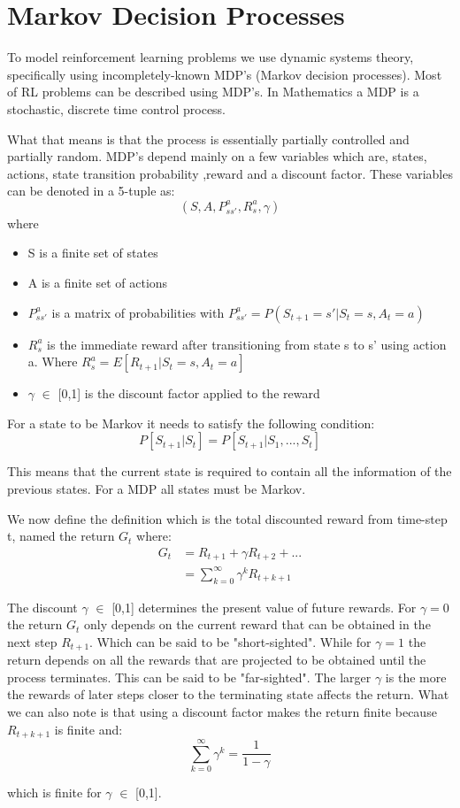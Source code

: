 \graphicspath{{MDP/fig/}}

\chapter{Markov Decision Processes}
\label{chap:MDP}

To model reinforcement learning problems we use dynamic systems theory, specifically using incompletely-known MDP's (Markov decision
processes). Most of RL problems can be described using MDP's. In Mathematics a MDP is a stochastic, discrete time control process.

What that means is that the process is essentially partially controlled and partially random. MDP's depend mainly on a few variables which are, states, actions, state transition probability ,reward and a discount factor\cite{sutton_barto}. These variables can be denoted in a 5-tuple as:
\[(S,A,P^{a}_{ss'},R^{a}_{s},\gamma)\] where
\begin{itemize}
	\item S is a finite set of states
	\item A is a finite set of actions
	\item $P^{a}_{ss'}$ is a matrix of probabilities with $P^{a}_{ss'} = P(S_{t+1} = s' | S_t = s,A_t = a) $
	\item $R^{a}_{s}$ is the immediate reward after transitioning from state s to s' using action a. Where $R^{a}_{s} = E[R_{t+1}|S_t =s, A_t =a]$
	\item $\gamma$ $\in$ [0,1] is the discount factor applied to the reward
\end{itemize}

For a state to be Markov it needs to satisfy the following condition:
\[P[S_{t+1}|S_{t}] = P[S_{t+1}|S_{1},...,S_{t}]\]

This means that the current state is required to contain all the information of the previous states. For a MDP all states must be Markov.

We now define the definition which is the total discounted reward from time-step t, named the return $G_t$ where:
\begin{align}
	G_t &= R_{t+1}+\gamma R_{t+2} + ... \\
	&= \sum_{k=0}^{\infty}\gamma^{k} R_{t+k+1}
	\label{eq:G_t}
\end{align}

The discount $\gamma$ $\in$ [0,1] determines the present value of future rewards. For $\gamma=0$ the return $G_t$ only depends on the current reward that can be obtained in the next step $R_{t+1}$. Which can be said to be "short-sighted". While for $\gamma=1$ the return depends on all the rewards that are projected to be obtained until the process terminates. This can be said to be "far-sighted". The larger $\gamma$ is the more the rewards of later steps closer to the terminating state affects the return.\cite{sutton_barto}
What we can also note is that using a discount factor makes the return finite because $R_{t+k+1}$ is finite and:
\[ \sum_{k=0}^{\infty}\gamma^{k}=\frac{1}{1-\gamma}\]
\centerline{which is finite for $\gamma$ $\in$ [0,1].}

